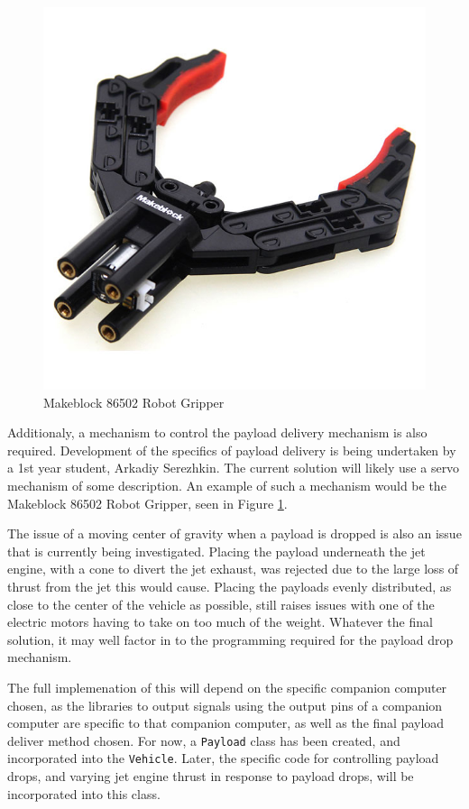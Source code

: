 \documentclass[11pt]{article}
\begin{document}
\begin{figure}
    \begin{center}
        \includegraphics[width=0.48\linewidth]{makeblock_gripper}
        \caption{Makeblock 86502 Robot Gripper}
        \label{fig:makeblock_gripper}
    \end{center}
\end{figure}

Additionaly, a mechanism to control the payload delivery mechanism is also required. Development of the specifics of payload delivery is being undertaken by a 1st year student, Arkadiy Serezhkin. The current solution will likely use a servo mechanism of some description. An example of such a mechanism would be the Makeblock 86502 Robot Gripper\cite{Makeblock_gripper}, seen in Figure \ref{fig:makeblock_gripper}.

The issue of a moving center of gravity when a payload is dropped is also an issue that is currently being investigated. Placing the payload underneath the jet engine, with a cone to divert the jet exhaust, was rejected due to the large loss of thrust from the jet this would cause. Placing the payloads evenly distributed, as close to the center of the vehicle as possible, still raises issues with one of the electric motors having to take on too much of the weight. Whatever the final solution, it may well factor in to the programming required for the payload drop mechanism. \label{payload_delivery}

The full implemenation of this will depend on the specific companion computer chosen, as the libraries to output signals using the output pins of a companion computer are specific to that companion computer, as well as the final payload deliver method chosen. For now, a \lstinline|Payload| class has been created, and incorporated into the \lstinline|Vehicle|. Later, the specific code for controlling payload drops, and varying jet engine thrust in response to payload drops, will be incorporated into this class.
\end{document}
